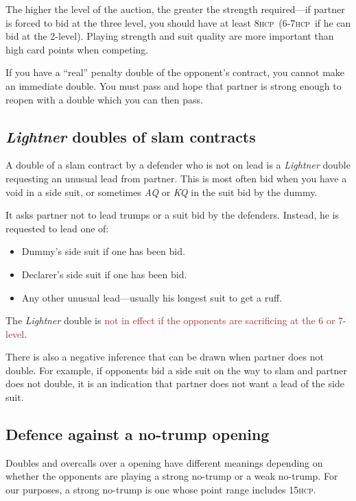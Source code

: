 \documentclass[a4paper,article,oneside]{memoir}
\newcommand{\hcp}{\textsc{hcp}}
\newcommand{\excp}[1]{\textcolor{Brown}{#1}} %
\begin{document}
The higher the level of the auction, the greater the strength required---if partner is forced to bid
at the three level, you should have at least 8\hcp\ (6-7\hcp\ if he can bid
at the 2-level).  Playing strength and suit quality are more important than high
card points when competing.

If you have a ``real'' penalty double of the opponent's contract, you cannot make
an immediate double. You must pass and hope that partner is strong enough to
reopen with a double which you can then pass.

\subsection{\emph{Lightner} doubles of slam contracts}

A double of a slam contract by a defender who is not on lead
is a \emph{Lightner} double requesting an
unusual lead from partner. This is most often bid when you have a void in a
side suit, or sometimes \emph{AQ} or \emph{KQ} in the suit bid by the dummy.

It asks partner not to lead trumps or a suit bid by the defenders. Instead, he is
requested to lead one of:
\begin{itemize}
\item Dummy's side suit if one has been bid.
\item Declarer's side suit if one has been bid.
\item Any other unusual lead---usually his longest suit to get a ruff.
\end{itemize}

The \emph{Lightner} double is \excp{not in effect if the opponents are sacrificing at
the 6 or 7-level}.

There is also a negative inference that can be drawn when partner does not
double. For example, if opponents bid a side suit on the way to slam and
partner does not double, it is an indication that partner does not want a lead
of the side suit.

\subsection{Defence against a no-trump opening}

Doubles and overcalls over a  opening have different meanings
depending on whether the opponents are playing a strong no-trump or a
weak no-trump. For our purposes, a strong no-trump is one whose point
range includes 15\hcp.
\end{document}
